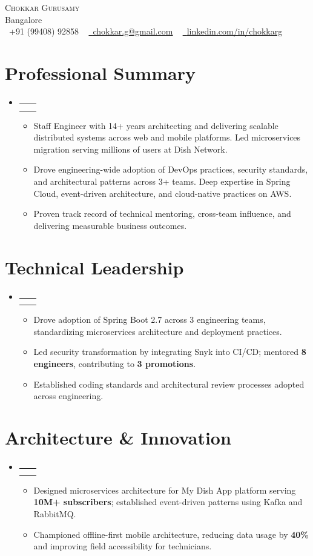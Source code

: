 \documentclass[letterpaper,11pt]{article}
\makeatletter
\newcommand{\resumeItem}[1]{
  \item\small{{#1 \vspace{-2pt}}}
}
\newcommand{\resumeSubheading}[4]{
  \vspace{-2pt}\item
    \begin{tabular*}{1.0\textwidth}[t]{l@{\extracolsep{\fill}}r}
      \textbf{#1} & \textbf{\small #2} \\
      \textit{\small#3} & \textit{\small #4} \\
    \end{tabular*}\vspace{-7pt}
}
\newcommand{\resumeSubHeadingListStart}{\begin{itemize}[leftmargin=0.0in, label={}]}
\newcommand{\resumeSubHeadingListEnd}{\end{itemize}}
\newcommand{\resumeItemListStart}{\begin{itemize}}
\newcommand{\resumeItemListEnd}{\end{itemize}\vspace{-5pt}}
\makeatother
\begin{document}
\begin{center}
    {\Huge \scshape Chokkar Gurusamy} \\ \vspace{1pt}
     Bangalore  \\ \vspace{1pt}
    \small \raisebox{-0.1\height}\faPhone\ +91 (99408) 92858 ~ \href{mailto:chokkar.g@gmail.com}{\raisebox{-0.2\height}\faEnvelope\  \underline{chokkar.g@gmail.com}} ~ 
    \href{https://linkedin.com/in/chokkarg}{\raisebox{-0.2\height}\faLinkedin\ \underline{linkedin.com/in/chokkarg}}
\end{center}

\section{Professional Summary}
\resumeSubHeadingListStart
\resumeSubheading{}{}{}{}
\resumeItemListStart
\resumeItem{Staff Engineer with 14+ years architecting and delivering scalable distributed systems across web and mobile platforms. Led microservices migration serving millions of users at Dish Network.}
\resumeItem{Drove engineering-wide adoption of DevOps practices, security standards, and architectural patterns across 3+ teams. Deep expertise in Spring Cloud, event-driven architecture, and cloud-native practices on AWS.}
\resumeItem{Proven track record of technical mentoring, cross-team influence, and delivering measurable business outcomes.}
\resumeItemListEnd
\resumeSubHeadingListEnd

\section{Technical Leadership}
\resumeSubHeadingListStart
\resumeSubheading{}{}{}{}
\resumeItemListStart
\resumeItem{Drove adoption of Spring Boot 2.7 across 3 engineering teams, standardizing microservices architecture and deployment practices.}
\resumeItem{Led security transformation by integrating Snyk into CI/CD; mentored \textbf{8 engineers}, contributing to \textbf{3 promotions}.}
 \resumeItem{Established coding standards and architectural review processes adopted across engineering.}
\resumeItemListEnd
\resumeSubHeadingListEnd
\vspace{-10pt}

\section{Architecture \& Innovation}
\resumeSubHeadingListStart
\resumeSubheading{}{}{}{}
\resumeItemListStart
\resumeItem{Designed microservices architecture for My Dish App platform serving \textbf{10M+ subscribers}; established event-driven patterns using Kafka and RabbitMQ.}
\resumeItem{Championed offline-first mobile architecture, reducing data usage by \textbf{40\%} and improving field accessibility for technicians.}
\resumeItemListEnd
\resumeSubHeadingListEnd
\vspace{-10pt}
\end{document}

